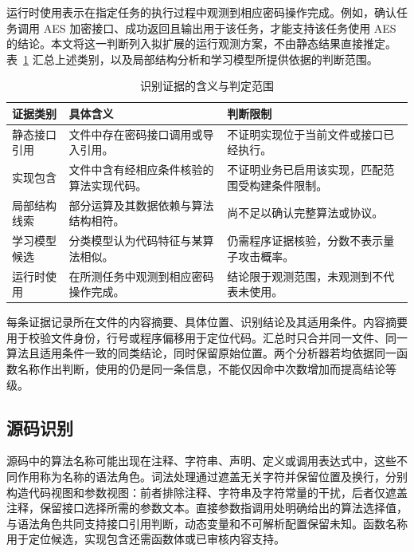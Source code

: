 运行时使用表示在指定任务的执行过程中观测到相应密码操作完成。例如，确认任务调用 AES 加密接口、成功返回且输出用于该任务，才能支持该任务使用 AES 的结论。本文将这一判断列入拟扩展的运行观测方案，不由静态结果直接推定。表~\ref{tab:evidence-claim-boundary} 汇总上述类别，以及局部结构分析和学习模型所提供依据的判断范围。

\begin{table}[htbp]\centering\small
  \caption{识别证据的含义与判定范围}
  \label{tab:evidence-claim-boundary}
  \begin{tabularx}{\linewidth}{@{}>{\raggedright\arraybackslash}p{2.2cm}X X@{}}\toprule
  证据类别 & 具体含义 & 判断限制\\\midrule
  静态接口引用 & 文件中存在密码接口调用或导入引用。 & 不证明实现位于当前文件或接口已经执行。\\
  实现包含 & 文件中含有经相应条件核验的算法实现代码。 & 不证明业务已启用该实现，匹配范围受构建条件限制。\\
  局部结构线索 & 部分运算及其数据依赖与算法结构相符。 & 尚不足以确认完整算法或协议。\\
  学习模型候选 & 分类模型认为代码特征与某算法相似。 & 仍需程序证据核验，分数不表示量子攻击概率。\\
  运行时使用 & 在所测任务中观测到相应密码操作完成。 & 结论限于观测范围，未观测到不代表未使用。\\\bottomrule
  \end{tabularx}
\end{table}

每条证据记录所在文件的内容摘要、具体位置、识别结论及其适用条件。内容摘要用于校验文件身份，行号或程序偏移用于定位代码。汇总时只合并同一文件、同一算法且适用条件一致的同类结论，同时保留原始位置。两个分析器若均依据同一函数名称作出判断，使用的仍是同一条信息，不能仅因命中次数增加而提高结论等级。

\subsection{源码识别}
\label{subsec:config-cpg-principles}

源码中的算法名称可能出现在注释、字符串、声明、定义或调用表达式中，这些不同作用称为名称的语法角色。词法处理通过遮盖无关字符并保留位置及换行，分别构造代码视图和参数视图：前者排除注释、字符串及字符常量的干扰，后者仅遮盖注释，保留接口选择所需的参数文本。直接参数指调用处明确给出的算法选择值，与语法角色共同支持接口引用判断，动态变量和不可解析配置保留未知。函数名称用于定位候选，实现包含还需函数体或已审核内容支持。

